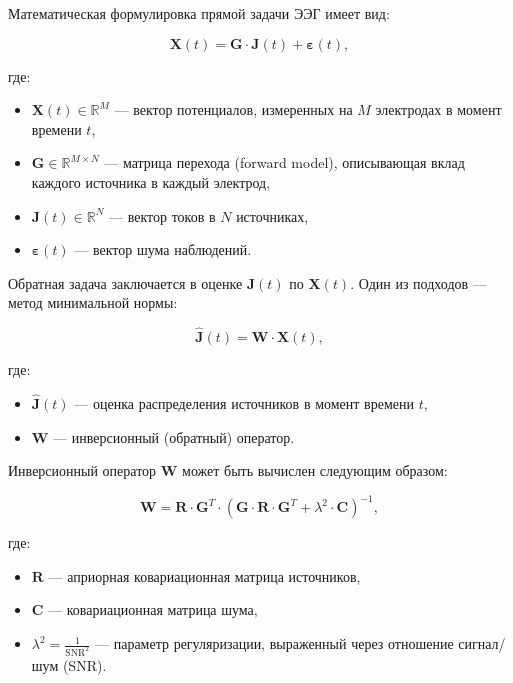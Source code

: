 Математическая формулировка прямой задачи ЭЭГ имеет вид:

\begin{equation}
\mathbf{X}(t) = \mathbf{G} \cdot \mathbf{J}(t) + \boldsymbol{\varepsilon}(t),
\label{eq:forward}
\end{equation}

где:
\begin{itemize}
    \item \(\mathbf{X}(t) \in \mathbb{R}^{M}\) — вектор потенциалов, измеренных на \(M\) электродах в момент времени \(t\),
    \item \(\mathbf{G} \in \mathbb{R}^{M \times N}\) — матрица перехода (forward model), описывающая вклад каждого источника в каждый электрод,
    \item \(\mathbf{J}(t) \in \mathbb{R}^{N}\) — вектор токов в \(N\) источниках,
    \item \(\boldsymbol{\varepsilon}(t)\) — вектор шума наблюдений.
\end{itemize}

Обратная задача заключается в оценке \(\mathbf{J}(t)\) по \(\mathbf{X}(t)\). Один из подходов — метод минимальной нормы:

\begin{equation}
\hat{\mathbf{J}}(t) = \mathbf{W} \cdot \mathbf{X}(t),
\label{eq:inverse}
\end{equation}

где:
\begin{itemize}
    \item \(\hat{\mathbf{J}}(t)\) — оценка распределения источников в момент времени \(t\),
    \item \(\mathbf{W}\) — инверсионный (обратный) оператор.
\end{itemize}

Инверсионный оператор \(\mathbf{W}\) может быть вычислен следующим образом:

\begin{equation}
\mathbf{W} = \mathbf{R} \cdot \mathbf{G}^T \cdot \left( \mathbf{G} \cdot \mathbf{R} \cdot \mathbf{G}^T + \lambda^2 \cdot \mathbf{C} \right)^{-1},
\label{eq:inverse_operator}
\end{equation}

где:
\begin{itemize}
    \item \(\mathbf{R}\) — априорная ковариационная матрица источников,
    \item \(\mathbf{C}\) — ковариационная матрица шума,
    \item \(\lambda^2 = \frac{1}{\text{SNR}^2}\) — параметр регуляризации, выраженный через отношение сигнал/шум (SNR).
\end{itemize}


